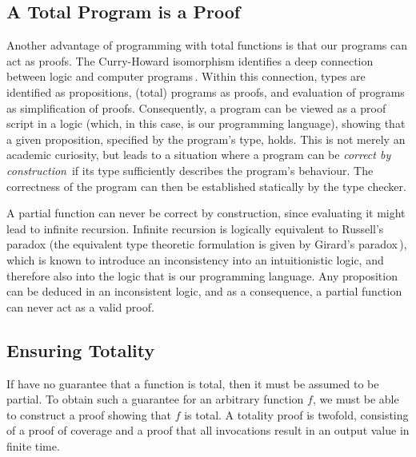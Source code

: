 \subsection{A Total Program is a Proof}
Another advantage of programming with total functions is that our programs can
act as proofs. The Curry-Howard isomorphism identifies a deep connection
between logic and computer
programs\,\citep{Curry1934,Howard80,Wadler2014}. Within this connection, types
are identified as propositions, (total) programs as proofs, and evaluation of
programs as simplification of proofs. Consequently, a program can be viewed as a
proof script in a logic (which, in this case, is our programming language),
showing that a given proposition, specified by the program's type, holds. This
is not merely an academic curiosity, but leads to a situation where a program
can be \emph{correct by construction}\,\citep{Pierce:2002:TPL:509043} if its
type sufficiently describes the program's behaviour. The correctness of the
program can then be established statically by the type checker.

A partial function can never be correct by construction, since evaluating it
might lead to infinite recursion. Infinite recursion is logically equivalent to
Russell's paradox (the equivalent type theoretic formulation is given by
Girard's paradox\,\citep{Girard1972}), which is known to introduce an inconsistency into an
intuitionistic logic, and therefore also into the logic that is our programming
language. Any proposition can be deduced in an inconsistent logic, and as a
consequence, a partial function can never act as a valid proof.


\subsection{Ensuring Totality}
If have no guarantee that a function is total, then it must be assumed to be partial. To
obtain such a guarantee for an arbitrary function $f$, we must be able to
construct a proof showing that $f$ is total. A totality proof is twofold,
consisting of a proof of coverage and a proof that all invocations result in an
output value in finite time.

